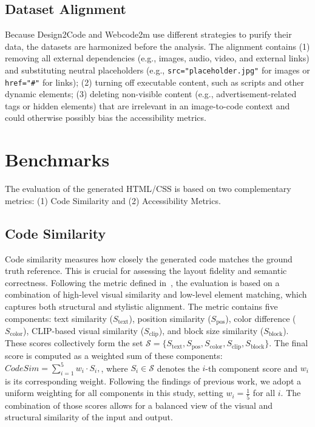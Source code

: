 \subsection{Dataset Alignment}
Because Design2Code and Webcode2m use different strategies to purify 
their data, the datasets are harmonized before the analysis. 
The alignment contains (1) removing all external dependencies (e.g., images, audio, 
video, and external links) and substituting neutral placeholders (e.g., \texttt{src="placeholder.jpg"}
for images or \texttt{href="\#"} for links); (2) turning off executable content, 
such as scripts and other dynamic elements; (3) deleting non-visible content (e.g.,
advertisement-related tags or hidden elements) that are irrelevant in 
an image-to-code context and could otherwise possibly bias 
the accessibility metrics.


\section{Benchmarks}
The evaluation of the generated HTML/CSS is based on two complementary 
metrics: (1) Code Similarity and (2) Accessibility Metrics.

\subsection{Code Similarity}
Code similarity measures how closely the generated code matches the ground
truth reference. This is crucial for assessing the layout fidelity and 
semantic correctness. Following the metric defined in~\cite{si2024design2code}, 
the evaluation is based on a combination of high-level visual 
similarity and low-level element matching, which captures both 
structural and stylistic alignment. 
The metric contains five components:
text similarity (\(S_{\text{text}}\)), position similarity 
(\(S_{\text{pos}}\)), color difference (\(S_{\text{color}}\)), 
CLIP-based visual similarity (\(S_{\text{clip}}\)), 
and block size similarity (\(S_{\text{block}}\)). 
These scores collectively form the set 
\(\mathcal{S} = \{S_{\text{text}}, S_{\text{pos}}, S_{\text{color}}, S_{\text{clip}}, S_{\text{block}}\}\). 
The final score is computed as a weighted sum of these components:
\(
\textit{CodeSim} = \sum_{i=1}^{5} w_i \cdot S_i,
\),
where \(S_i \in \mathcal{S}\) denotes the \(i\)-th component score and \(w_i\) is its corresponding weight.
Following the findings of previous work, we adopt a uniform weighting for all components in this study, setting \(w_i = \frac{1}{5}\) for all \(i\).
The combination of those scores allows for a balanced view of the visual and 
structural similarity of the input and output.

